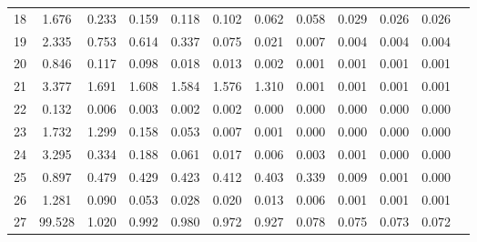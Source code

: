\begin{table}[!h]
{\begin{tabular}{|c|cccccccccc|c|}
18 & 1.676 & 0.233 & 0.159 & 0.118 & 0.102 & 0.062 & 0.058 & 0.029 & 0.026 & 0.026 \\
19 & 2.335 & 0.753 & 0.614 & 0.337 & 0.075 & 0.021 & 0.007 & 0.004 & 0.004 & 0.004 \\
20 & 0.846 & 0.117 & 0.098 & 0.018 & 0.013 & 0.002 & 0.001 & 0.001 & 0.001 & 0.001 \\
21 & 3.377 & 1.691 & 1.608 & 1.584 & 1.576 & 1.310 & 0.001 & 0.001 & 0.001 & 0.001 \\
22 & 0.132 & 0.006 & 0.003 & 0.002 & 0.002 & 0.000 & 0.000 & 0.000 & 0.000 & 0.000 \\
23 & 1.732 & 1.299 & 0.158 & 0.053 & 0.007 & 0.001 & 0.000 & 0.000 & 0.000 & 0.000 \\
24 & 3.295 & 0.334 & 0.188 & 0.061 & 0.017 & 0.006 & 0.003 & 0.001 & 0.000 & 0.000 \\
25 & 0.897 & 0.479 & 0.429 & 0.423 & 0.412 & 0.403 & 0.339 & 0.009 & 0.001 & 0.000 \\
26 & 1.281 & 0.090 & 0.053 & 0.028 & 0.020 & 0.013 & 0.006 & 0.001 & 0.001 & 0.001 \\
27 & 99.528 & 1.020 & 0.992 & 0.980 & 0.972 & 0.927 & 0.078 & 0.075 & 0.073 & 0.072 \\
\hline
\end{tabular}
}
\end{table}



